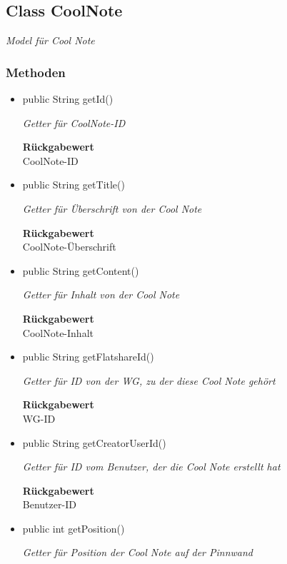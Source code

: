 \documentclass[a4paper]{scrreprt}
\begin{document}
    \subsection{Class CoolNote}
    \textit{Model für Cool Note}
    \subsubsection{Methoden}
    \begin{itemize}
    	\item{public String getId()}
    	
    	\textit{Getter für CoolNote-ID}
    	
    	
    	
    	\textbf{Rückgabewert} \\
    	CoolNote-ID        \item{public String getTitle()}
    	
    	\textit{Getter für Überschrift von der Cool Note}
    	
    	
    	
    	\textbf{Rückgabewert} \\
    	CoolNote-Überschrift        \item{public String getContent()}
    	
    	\textit{Getter für Inhalt von der Cool Note}
    	
    	
    	
    	\textbf{Rückgabewert} \\
    	CoolNote-Inhalt        \item{public String getFlatshareId()}
    	
    	\textit{Getter für ID von der WG, zu der diese Cool Note gehört}
    	
    	
    	
    	\textbf{Rückgabewert} \\
    	WG-ID        \item{public String getCreatorUserId()}
    	
    	\textit{Getter für ID vom Benutzer, der die Cool Note erstellt hat}
    	
    	
    	
    	\textbf{Rückgabewert} \\
    	Benutzer-ID        \item{public int getPosition()}
    	
    	\textit{Getter für Position der Cool Note auf der Pinnwand}
    	
    	
    	

\end{itemize}
\end{document}
